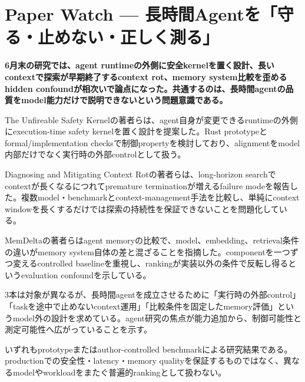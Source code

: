 \section{Paper Watch — 長時間Agentを「守る・止めない・正しく測る」}
\noindent\textbf{6月末の研究では、agent runtimeの外側に安全kernelを置く設計、長いcontextで探索が早期終了するcontext rot、memory system比較を歪めるhidden confoundが相次いで論点になった。共通するのは、長時間agentの品質をmodel能力だけで説明できないという問題意識である。}\autocite{src-246f07f416dc,src-644589094c65,src-8603fd60d637}

The Unfireable Safety Kernelの著者らは、agent自身が変更できるruntimeの外側にexecution-time safety kernelを置く設計を提案した。Rust prototypeとformal/implementation checksで制御propertyを検討しており、alignmentをmodel内部だけでなく実行時の外部controlとして扱う。\autocite{src-644589094c65}


Diagnosing and Mitigating Context Rotの著者らは、long-horizon searchでcontextが長くなるにつれてpremature terminationが増えるfailure modeを報告した。複数model・benchmarkとcontext-management手法を比較し、単純にcontext windowを長くするだけでは探索の持続性を保証できないことを問題化している。\autocite{src-8603fd60d637}


MemDeltaの著者らはagent memoryの比較で、model、embedding、retrieval条件の違いがmemory system自体の差と混ざることを指摘した。componentを一つずつ変えるcontrolled baselineを重視し、rankingが実装以外の条件で反転し得るというevaluation confoundを示している。\autocite{src-246f07f416dc}


3本は対象が異なるが、長時間agentを成立させるために「実行時の外部control」「taskを途中で止めないcontext運用」「比較条件を固定したmemory評価」というmodel外の設計を求めている。agent研究の焦点が能力追加から、制御可能性と測定可能性へ広がっていることを示す。\autocite{src-246f07f416dc,src-644589094c65,src-8603fd60d637}


\begin{claimboundary}
いずれもprototypeまたはauthor-controlled benchmarkによる研究結果である。productionでの安全性・latency・memory qualityを保証するものではなく、異なるmodelやworkloadをまたぐ普遍的rankingとして扱わない。\autocite{src-246f07f416dc,src-644589094c65,src-8603fd60d637}
\end{claimboundary}
